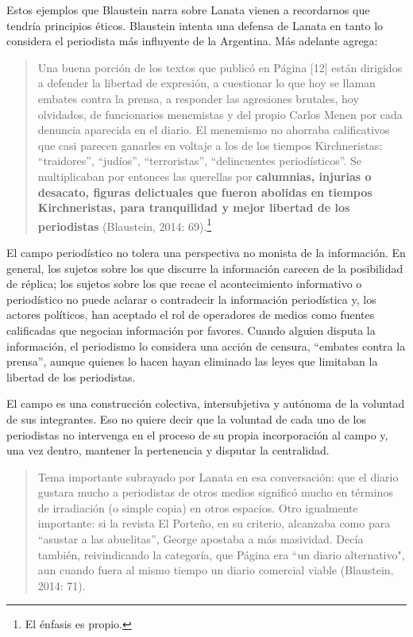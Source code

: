 Estos ejemplos que Blaustein narra sobre Lanata vienen a recordarnos que tendría principios éticos. Blaustein intenta una defensa de Lanata en tanto lo considera el periodista más influyente de la Argentina. Más adelante agrega:

\begin{quote}
Una buena porción de los textos que publicó en Página {[}12{]} están dirigidos a defender la libertad de expresión, a cuestionar lo que hoy se llaman embates contra la prensa, a responder las agresiones brutales, hoy olvidados, de funcionarios menemistas y del propio Carlos Menen por cada denuncia aparecida en el diario. El menemismo no ahorraba calificativos que casi parecen ganarles en voltaje a los de los tiempos Kirchneristas: ``traidores'', ``judíos'', ``terroristas'', ``delincuentes periodísticos''. Se multiplicaban por entonces las querellas por \textbf{calumnias, injurias o desacato, figuras delictuales que fueron abolidas en tiempos Kirchneristas, para tranquilidad y mejor libertad de los periodistas} (Blaustein, 2014: 69).\footnote{El énfasis es propio.}
\end{quote}

El campo periodístico no tolera una perspectiva no monista de la información. En general, los sujetos sobre los que discurre la información carecen de la posibilidad de réplica; los sujetos sobre los que recae el acontecimiento informativo o periodístico no puede aclarar o contradecir la información periodística y, los actores políticos, han aceptado el rol de operadores de medios como fuentes calificadas que negocian información por favores. Cuando alguien disputa la información, el periodismo lo considera una acción de censura, ``embates contra la prensa'', aunque quienes lo hacen hayan eliminado las leyes que limitaban la libertad de los periodistas.

El campo es una construcción colectiva, intersubjetiva y autónoma de la voluntad de sus integrantes. Eso no quiere decir que la voluntad de cada uno de los periodistas no intervenga en el proceso de su propia incorporación al campo y, una vez dentro, mantener la pertenencia y disputar la centralidad.

\begin{quote}
Tema importante subrayado por Lanata en esa conversación: que el diario gustara mucho a periodistas de otros medios significó mucho en términos de irradiación (o simple copia) en otros espacios. Otro igualmente importante: si la revista El Porteño, en su criterio, alcanzaba como para ``asustar a las abuelitas'', George apostaba a más masividad. Decía también, reivindicando la categoría, que Página era ``un diario alternativo", aun cuando fuera al mismo tiempo un diario comercial viable (Blaustein, 2014: 71).
\end{quote}

